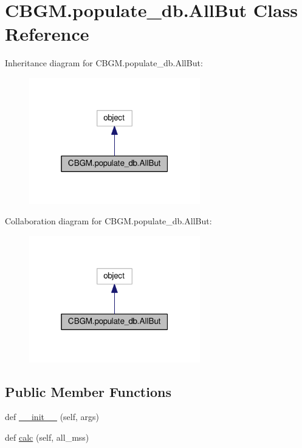 \hypertarget{classCBGM_1_1populate__db_1_1AllBut}{}\section{C\+B\+G\+M.\+populate\+\_\+db.\+All\+But Class Reference}
\label{classCBGM_1_1populate__db_1_1AllBut}


Inheritance diagram for C\+B\+G\+M.\+populate\+\_\+db.\+All\+But\+:\nopagebreak
\begin{figure}[H]
\begin{center}
\leavevmode
\includegraphics[width=211pt]{classCBGM_1_1populate__db_1_1AllBut__inherit__graph}
\end{center}
\end{figure}


Collaboration diagram for C\+B\+G\+M.\+populate\+\_\+db.\+All\+But\+:\nopagebreak
\begin{figure}[H]
\begin{center}
\leavevmode
\includegraphics[width=211pt]{classCBGM_1_1populate__db_1_1AllBut__coll__graph}
\end{center}
\end{figure}
\subsection*{Public Member Functions}
\begin{DoxyCompactItemize}
\item 
def \hyperlink{classCBGM_1_1populate__db_1_1AllBut_a7f23c47c62468a12f01159d9fc1f0db5}{\+\_\+\+\_\+init\+\_\+\+\_\+} (self, args)
\item 
def \hyperlink{classCBGM_1_1populate__db_1_1AllBut_a82d4d8c2a8510e574add9123315d8eb9}{calc} (self, all\+\_\+mss)
\end{DoxyCompactItemize}
